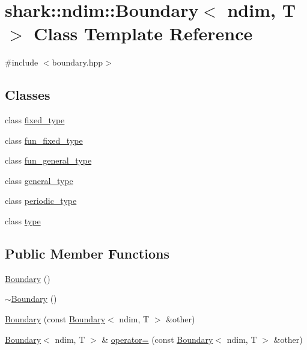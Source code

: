 \hypertarget{classshark_1_1ndim_1_1_boundary}{}\section{shark\+:\+:ndim\+:\+:Boundary$<$ ndim, T $>$ Class Template Reference}
\label{classshark_1_1ndim_1_1_boundary}


{\ttfamily \#include $<$boundary.\+hpp$>$}

\subsection*{Classes}
\begin{DoxyCompactItemize}
\item 
class \hyperlink{classshark_1_1ndim_1_1_boundary_1_1fixed__type}{fixed\+\_\+type}
\item 
class \hyperlink{classshark_1_1ndim_1_1_boundary_1_1fun__fixed__type}{fun\+\_\+fixed\+\_\+type}
\item 
class \hyperlink{classshark_1_1ndim_1_1_boundary_1_1fun__general__type}{fun\+\_\+general\+\_\+type}
\item 
class \hyperlink{classshark_1_1ndim_1_1_boundary_1_1general__type}{general\+\_\+type}
\item 
class \hyperlink{classshark_1_1ndim_1_1_boundary_1_1periodic__type}{periodic\+\_\+type}
\item 
class \hyperlink{classshark_1_1ndim_1_1_boundary_1_1type}{type}
\end{DoxyCompactItemize}
\subsection*{Public Member Functions}
\begin{DoxyCompactItemize}
\item 
\hyperlink{classshark_1_1ndim_1_1_boundary_a7c4c8db45b13dab630e4c6ed7a958e71}{Boundary} ()
\item 
\hyperlink{classshark_1_1ndim_1_1_boundary_a86eab4f2362618c5b1e3d0df3a5f7f42}{$\sim$\+Boundary} ()
\item 
\hyperlink{classshark_1_1ndim_1_1_boundary_a530ae26f4011eaf93935de5a357ea22a}{Boundary} (const \hyperlink{classshark_1_1ndim_1_1_boundary}{Boundary}$<$ ndim, T $>$ \&other)
\item 
\hyperlink{classshark_1_1ndim_1_1_boundary}{Boundary}$<$ ndim, T $>$ \& \hyperlink{classshark_1_1ndim_1_1_boundary_afbdf2a3d58ac7c831e5911c6ff86cfb8}{operator=} (const \hyperlink{classshark_1_1ndim_1_1_boundary}{Boundary}$<$ ndim, T $>$ \&other)
\end{DoxyCompactItemize}
